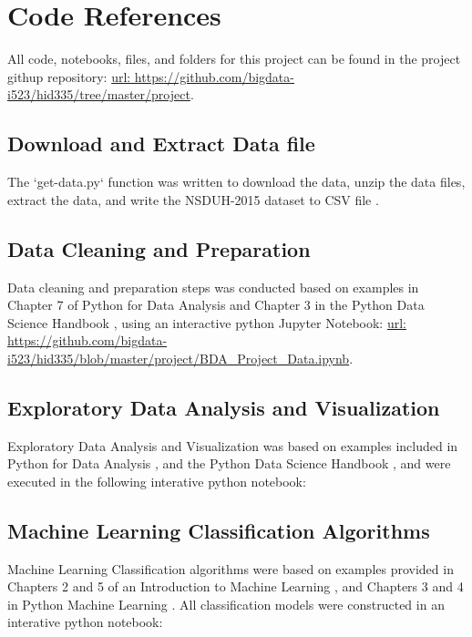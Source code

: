 \documentclass[sigconf]{acmart}
\begin{document}

 


\appendix



\section{Code References}

All code, notebooks, files, and folders for this project can be found in the
project githup repository: \url{url:  https://github.com/bigdata-i523/hid335/tree/master/project}.

\subsection{Download and Extract Data file \cite{getdata17}}
The `get-data.py` function was written to download the data, unzip the data
files, extract the data, and write the NSDUH-2015 dataset to CSV file 
\cite{getdata17}.

\subsection{Data Cleaning and Preparation \cite{mckinney17}}
Data cleaning and preparation steps was conducted based on examples in 
Chapter 7 of Python for Data Analysis \cite{mckinney17} and Chapter 3 in 
the Python Data Science Handbook \cite{vanderplas17}, using an interactive 
python Jupyter Notebook: \url{url: https://github.com/bigdata-i523/hid335/blob/master/project/BDA_Project_Data.ipynb}.

\subsection{Exploratory Data Analysis and Visualization\cite{vanderplas17}}
Exploratory Data Analysis and Visualization was based on examples included
in Python for Data Analysis \cite{mckinney17}, and the Python Data Science 
Handbook \cite{vanderplas17}, and were executed in the following interative
python notebook: 


\subsection{Machine Learning Classification Algorithms\cite{muller17, raschka17}}
Machine Learning Classification algorithms were based on examples provided
in Chapters 2 and 5 of an Introduction to Machine Learning \cite{muller17},
and Chapters 3 and 4 in Python Machine Learning \cite{raschka17}. All 
classification models were constructed in an interative python notebook: 
\end{document}
